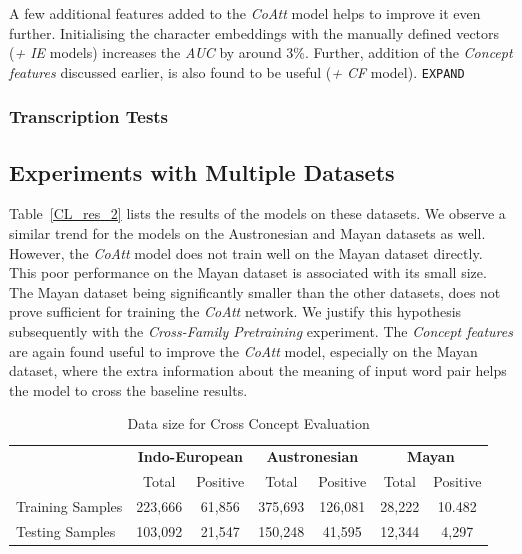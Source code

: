 \documentclass[11pt,letterpaper]{article}
\begin{document}
A few additional features added to the \textit{CoAtt} model helps to improve it even further. Initialising the character embeddings with the manually defined vectors (\textit{+ IE} models) increases the \textit{AUC} by around 3\%. Further, addition of the \textit{Concept features} discussed earlier, is also found to be useful (\textit{+ CF} model). \texttt{EXPAND}

\subsubsection{Transcription Tests}

\subsection{Experiments with Multiple Datasets}

Table~\ref{CL_res_2} lists the results of the models on these datasets. We observe a similar trend for the models on the Austronesian and Mayan datasets as well. However, the \textit{CoAtt} model does not train well on the Mayan dataset directly. This poor performance on the Mayan dataset is associated with its small size. The Mayan dataset being significantly smaller than the other datasets, does not prove sufficient for training the \textit{CoAtt} network. We justify this hypothesis subsequently with the \textit{Cross-Family Pretraining} experiment. The \textit{Concept features} are again found useful to improve the \textit{CoAtt} model, especially on the Mayan dataset, where the extra information about the meaning of input word pair helps the model to cross the baseline results. 

\begin{table}[t]
\centering
\begin{tabular}{lcccccc}
\multicolumn{1}{c}{\textbf{}} & \multicolumn{2}{c}{\textbf{Indo-European}} & \multicolumn{2}{c}{\textbf{Austronesian}} & \multicolumn{2}{c}{\textbf{Mayan}} \\
\multicolumn{1}{c}{}          & Total               & Positive             & Total               & Positive            & Total           & Positive         \\
Training Samples              & 223,666             & 61,856               & 375,693             & 126,081             & 28,222          & 10.482           \\
Testing Samples               & 103,092             & 21,547               & 150,248             & 41,595              & 12,344          & 4,297           
\end{tabular}
\caption{Data size for Cross Concept Evaluation}
\label{CC_count}
\end{table}
\end{document}

